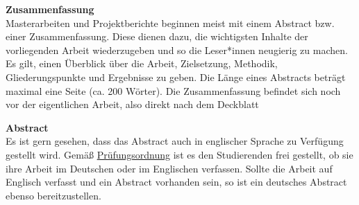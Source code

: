 \noindent\textbf{Zusammenfassung}\\
\noindent
Masterarbeiten und Projektberichte beginnen meist mit einem Abstract bzw. einer Zusammenfassung. Diese dienen dazu, die wichtigsten Inhalte der vorliegenden Arbeit wiederzugeben und so die Leser*innen neugierig zu machen. Es 
gilt, einen Überblick über die Arbeit, Zielsetzung, Methodik, Gliederungspunkte und Ergebnisse zu geben. Die Länge eines Abstracts beträgt maximal eine 
Seite (ca. 200 Wörter). Die Zusammenfassung befindet sich noch vor der eigentlichen Arbeit, also direkt nach dem Deckblatt

\bigskip
\noindent\textbf{Abstract}\\
Es ist gern gesehen, dass das Abstract auch in englischer Sprache zu Verfügung  gestellt wird. Gemäß \href{https://www.uni-regensburg.de/assets/studium/pruefungsordnungen/magister-master/digital-humanities-20200713.pdf}{Prüfungsordnung} ist es den Studierenden frei gestellt, ob sie ihre Arbeit im Deutschen oder im Englischen verfassen. Sollte die Arbeit auf Englisch verfasst und ein Abstract vorhanden sein, so ist ein deutsches Abstract ebenso bereitzustellen.
\thispagestyle{empty}
